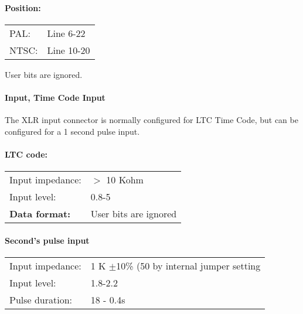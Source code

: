 \paragraph{Position:}
\begin{tabular}{l l}
PAL:		& Line 6-22 \\
NTSC:		& Line 10-20 \\
\end{tabular}

User bits are ignored.

\paragraph{Input, Time Code Input}
The XLR input connector is normally configured for LTC Time Code, but can be configured for a 1 second pulse input.

\paragraph{LTC code:}
\begin{tabular}{l l}
Input impedance:			& $>$ 10 Kohm \\
Input level:					& 0.8-5 \Vpp \\
\textbf{Data format:}	& User bits are ignored \\
\end{tabular}

\paragraph{Second's pulse input}
\begin{tabular}{l l}
Input impedance:			& 1 K \ohm  $\pm$10\% (50 \ohm  by internal jumper setting \\
Input level:					& 1.8-2.2 \Vpp \\
Pulse duration:				& 18 \us  - 0.4s \\
\end{tabular}

